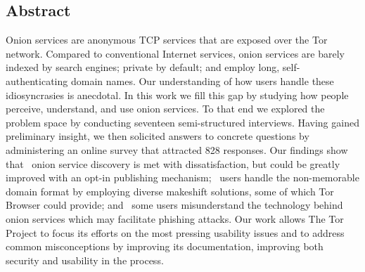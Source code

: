 \subsection*{Abstract}
Onion services are anonymous TCP services that are exposed over the Tor network.
Compared to conventional Internet services, onion services are barely indexed by
search engines; private by default; and employ long, self-authenticating domain
names.  Our understanding of how users handle these idiosyncrasies is anecdotal.
In this work we fill this gap by studying how people perceive, understand, and
use onion services.  To that end we explored the problem space by conducting
seventeen semi-structured interviews.  Having gained preliminary insight, we
then solicited answers to concrete questions by administering an online survey
that attracted 828 responses.  Our findings show that \first~onion service
discovery is met with dissatisfaction, but could be greatly improved with an
opt-in publishing mechanism; \second~users handle the non-memorable domain
format by employing diverse makeshift solutions, some of which Tor Browser could
provide; and \third~some users misunderstand the technology behind onion
services which may facilitate phishing attacks.
Our work allows The Tor Project to focus its efforts on the most pressing
usability issues and to address common misconceptions by improving its
documentation, improving both security and usability in the process.
